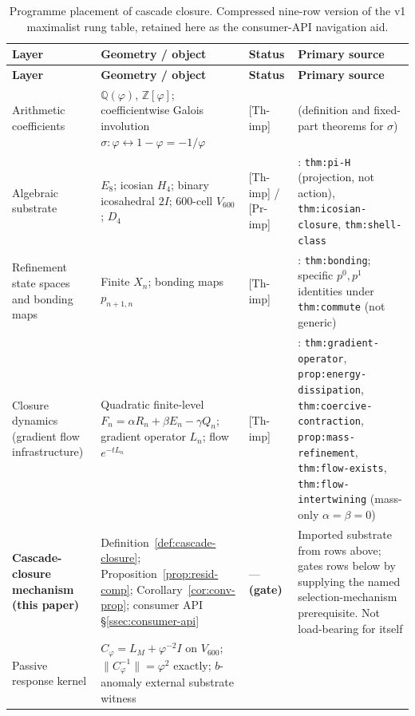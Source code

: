 \documentclass[11pt]{article}
\theoremstyle{definition}
\newcommand{\Q}{\mathbb{Q}}
\newcommand{\Z}{\mathbb{Z}}
\newcommand{\pphi}{\varphi}
\newcommand{\Vsub}{V_{600}}
\newcommand{\Cphi}{C_{\pphi}}
\begin{document}
\renewcommand{\arraystretch}{1.20}
\begin{longtable}{>{\raggedright\arraybackslash}p{}>{\raggedright\arraybackslash}p{}>{\raggedright\arraybackslash}p{}>{\raggedright\arraybackslash}p{}}
\caption{Programme placement of cascade closure. Compressed
nine-row version of the v1 maximalist rung table, retained here as
the consumer-API navigation aid.}\label{tab:rung-placement}\\
\toprule
\textbf{Layer} & \textbf{Geometry / object} & \textbf{Status} & \textbf{Primary source} \\
\midrule
\endfirsthead
\toprule
\textbf{Layer} & \textbf{Geometry / object} & \textbf{Status} & \textbf{Primary source} \\
\midrule
\endhead
Arithmetic coefficients
& $\Q(\pphi)$, $\Z[\pphi]$; coefficientwise Galois involution $\sigma : \pphi \leftrightarrow 1 - \pphi = -1/\pphi$
& \textsf{[Th-imp]}
& \cite{CascadeSigmaRat} (definition and fixed-part theorems for $\sigma$) \\
Algebraic substrate
& $E_8$; icosian $H_4$; binary icosahedral $2I$; 600-cell $\Vsub$; $D_4$
& \textsf{[Th-imp]} / \textsf{[Pr-imp]}
& \cite{CascadeAlgSubstrate}: \texttt{thm:pi-H} (projection, not action), \texttt{thm:icosian-closure}, \texttt{thm:shell-class} \\
Refinement state spaces and bonding maps
& Finite $X_n$; bonding maps $p_{n+1, n}$
& \textsf{[Th-imp]}
& \cite{CascadeRefinementSpaces}: \texttt{thm:bonding}; specific $p^0, p^1$ identities under \texttt{thm:commute} (not generic) \\
Closure dynamics (gradient flow infrastructure)
& Quadratic finite-level $F_n = \alpha R_n + \beta E_n - \gamma Q_n$; gradient operator $L_n$; flow $e^{-tL_n}$
& \textsf{[Th-imp]}
& \cite{CascadeClosureDynamics}: \texttt{thm:gradient-operator}, \texttt{prop:energy-dissipation}, \texttt{thm:coercive-contraction}, \texttt{prop:mass-refinement}, \texttt{thm:flow-exists}, \texttt{thm:flow-intertwining} (mass-only $\alpha = \beta = 0$) \\
\textbf{Cascade-closure mechanism (this paper)}
& Definition~\ref{def:cascade-closure}; Proposition~\ref{prop:resid-comp}; Corollary~\ref{cor:conv-prop}; consumer API \S\ref{ssec:consumer-api}
& --- \textbf{(gate)}
& Imported substrate from rows above; gates rows below by supplying the named selection-mechanism prerequisite. Not load-bearing for itself \\
Passive response kernel
& $\Cphi = L_M + \pphi^{-2} I$ on $\Vsub$; $\|\Cphi^{-1}\| = \pphi^2$ exactly; $b$-anomaly external substrate witness

\end{longtable}
\end{document}
